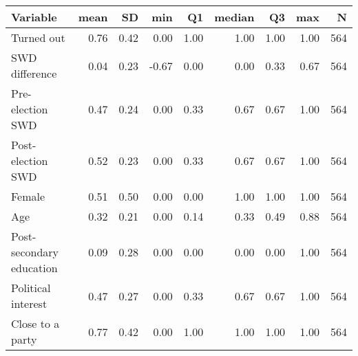 
\begin{tabular}{l|r|r|r|r|r|r|r|r}
\hline
Variable & mean & SD & min & Q1 & median & Q3 & max & N\\
\hline
Turned out & 0.76 & 0.42 & 0.00 & 1.00 & 1.00 & 1.00 & 1.00 & 564\\
\hline
SWD difference & 0.04 & 0.23 & -0.67 & 0.00 & 0.00 & 0.33 & 0.67 & 564\\
\hline
Pre-election SWD & 0.47 & 0.24 & 0.00 & 0.33 & 0.67 & 0.67 & 1.00 & 564\\
\hline
Post-election SWD & 0.52 & 0.23 & 0.00 & 0.33 & 0.67 & 0.67 & 1.00 & 564\\
\hline
Female & 0.51 & 0.50 & 0.00 & 0.00 & 1.00 & 1.00 & 1.00 & 564\\
\hline
Age & 0.32 & 0.21 & 0.00 & 0.14 & 0.33 & 0.49 & 0.88 & 564\\
\hline
Post-secondary education & 0.09 & 0.28 & 0.00 & 0.00 & 0.00 & 0.00 & 1.00 & 564\\
\hline
Political interest & 0.47 & 0.27 & 0.00 & 0.33 & 0.67 & 0.67 & 1.00 & 564\\
\hline
Close to a party & 0.77 & 0.42 & 0.00 & 1.00 & 1.00 & 1.00 & 1.00 & 564\\
\hline
\end{tabular}
